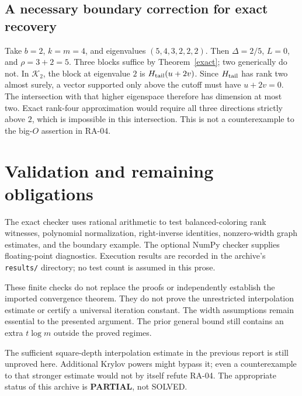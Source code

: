 \documentclass[11pt]{article}
\newcommand{\K}{\mathcal K}
\begin{document}
\subsection{A necessary boundary correction for exact recovery}
Take $b=2$, $k=m=4$, and eigenvalues $(5,4,3,2,2,2)$. Then $\Delta=2/5$,
$L=0$, and $\rho=3+2=5$. Three blocks suffice by Theorem~\ref{exact};
two generically do not. In $\K_2$, the block at eigenvalue $2$ is
$H_{\rm tail}(u+2v)$. Since $H_{\rm tail}$ has rank two almost surely,
a vector supported only above the cutoff must have $u+2v=0$. The intersection
with that higher eigenspace therefore has dimension at most two. Exact
rank-four approximation would require all three directions strictly above
$2$, which is impossible in this intersection. This is not a counterexample
to the big-$O$ assertion in RA-04.

\section{Validation and remaining obligations}
The exact checker uses rational arithmetic to test balanced-coloring rank
witnesses, polynomial normalization, right-inverse identities, nonzero-width
graph estimates, and the boundary example. The optional NumPy checker supplies
floating-point diagnostics. Execution results are recorded in the archive's
\texttt{results/} directory; no test count is assumed in this prose.

These finite checks do not replace the proofs or independently establish the
imported convergence theorem. They do not prove the unrestricted interpolation
estimate or certify a universal iteration constant. The width assumptions
remain essential to the presented argument. The prior general bound still
contains an extra $t\log m$ outside the proved regimes.

The sufficient square-depth interpolation estimate in the previous report is
still unproved here. Additional Krylov powers might bypass it; even a
counterexample to that stronger estimate would not by itself refute RA-04.
The appropriate status of this archive is \textbf{PARTIAL}, not SOLVED.
\end{document}

